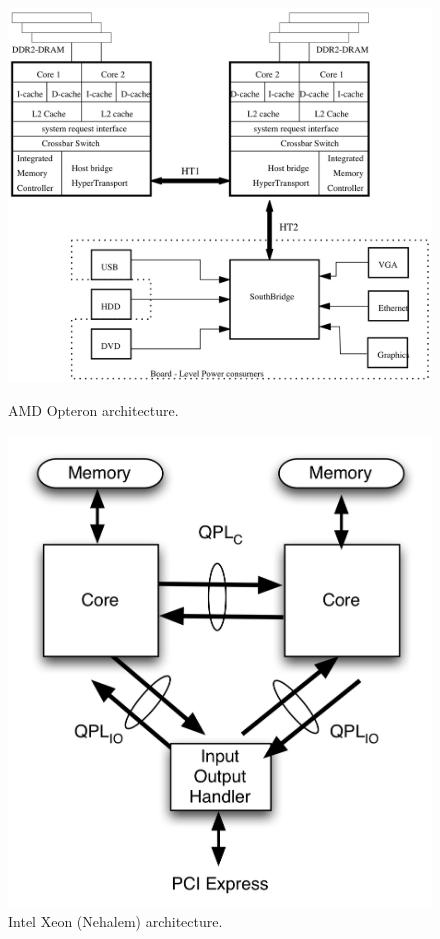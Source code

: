 \documentclass[prodmode,acmtaco,pdftex]{acmsmall}
\begin{document}
\begin{figure}[tp]
  \begin{minipage}{0.5\linewidth}
  \centering
     \includegraphics[scale=0.3]{x2200sys}
     \caption{AMD Opteron architecture.}
     \label{fig:amdarch}
  \end{minipage}\hspace{0.1cm}
  \begin{minipage}{0.5\linewidth}
  \centering
     \includegraphics[scale=0.5]{intelnehalem}
     \caption{Intel Xeon (Nehalem) architecture.}
     \label{fig:intarch}
  \end{minipage}
\end{figure}
\end{document}
